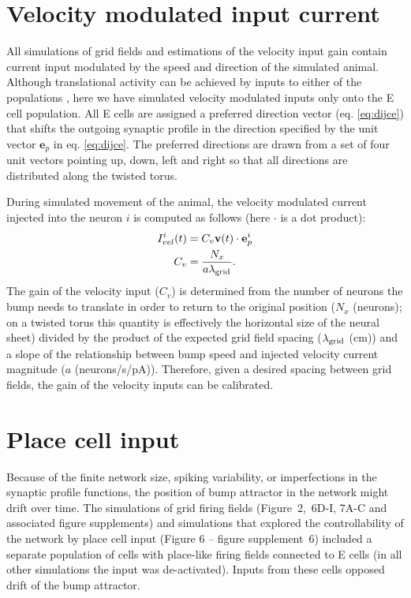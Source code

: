 \documentclass[a4paper,12pt]{article}
\newcommand{\ssc}[3]{\ensuremath{#1_{\text{#2}_{\text{#3}}}}}
\newcommand{\lamgrid}{\ssc{\lambda}{\scriptsize{grid}}{}}
\begin{document}


\section{Velocity modulated input current } \label{sec:Ivel}

All simulations of grid fields and estimations of the velocity input gain
contain current input modulated by the speed and direction of the simulated
animal. Although translational activity can be achieved by inputs to either of
the populations \citep{Pastoll:2013ff}, here we have simulated velocity
modulated inputs only onto the E cell population. All E cells are assigned a
preferred direction vector (eq. \ref{eq:dijce}) that shifts the outgoing
synaptic profile in the direction specified by the unit vector $\mathbf{e}_p$
in eq. \eqref{eq:dijce}. The preferred directions are drawn from a set of four
unit vectors pointing up, down, left and right so that all directions are
distributed along the twisted torus.

During simulated movement of the animal, the velocity modulated current
injected into the neuron $i$ is computed as follows (here $\cdot$ is a dot
product):
\begin{eqnarray}
    I_{vel}^i(t) &= C_v \mathbf{v}(t) \cdot \mathbf{e}_p^i \notag \\
    C_v          &= \frac{N_x}{a\lamgrid}.
\end{eqnarray}
The gain of the velocity input ($C_v$) is determined from the number of neurons
the bump needs to translate in order to return to the original position
($N_x$ (neurons); on a twisted torus this quantity is effectively the horizontal size of
the neural sheet) divided by the product of the expected grid field spacing
($\lamgrid$ (cm)) and a slope of the relationship between bump speed and injected
velocity current magnitude ($a$ (neurons/s/pA)). Therefore, given a desired
spacing between grid fields, the gain of the velocity inputs can be calibrated.


\section{Place cell input} \label{sec:place_cells}

Because of the finite network size, spiking variability, or imperfections in
the synaptic profile functions, the position of bump attractor in the network
might drift over time. The simulations of grid firing fields (Figure~2,~6D-I,
7A-C and associated figure supplements) and simulations that explored the
controllability of the network by place cell input (Figure 6 -- figure
supplement~6) included a separate population of cells
with place-like firing fields connected to E cells (in all other simulations
the input was de-activated). Inputs from these cells opposed drift of the bump
attractor.
\end{document}
